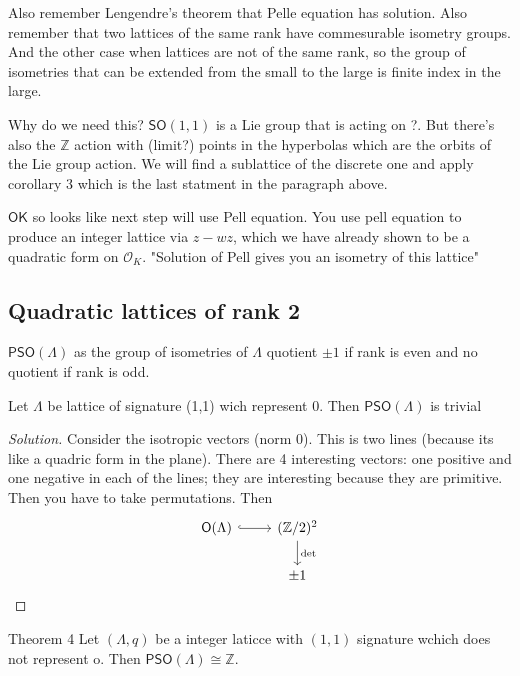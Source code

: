 Also remember Lengendre's theorem that Pelle equation has solution. Also remember that two lattices of the same rank have commesurable isometry groups. And the other case when lattices are not of the same rank, so the group of isometries that can be extended from the small to the large is finite index in the large.

Why do we need this? $\mathsf{SO}(1,1)$ is a Lie group that is acting on ?. But there's also the $\mathbb{Z}$ action with (limit?) points in the hyperbolas which are the orbits of the Lie group action. We will find a sublattice of the discrete one and apply corollary 3 which is the last statment in the paragraph above.

$\mathsf{OK}$ so looks like next step will use Pell equation. You use pell equation to produce an integer lattice via $z-wz$, which we have already shown to be a quadratic form on $\mathcal{O}_K$. {\color{4}"Solution of Pell gives you an isometry of this lattice"}

\subsection{Quadratic lattices of rank 2}

\begin{defn}\leavevmode
	$\mathsf{PSO}(\Lambda)$ as the group of isometries of $\Lambda$ quotient $\pm 1$ if rank is even and no quotient if rank is odd.
\end{defn}

\begin{exercise}\leavevmode
	Let $\Lambda$ be lattice of signature (1,1) wich represent 0. Then $\mathsf{PSO}(\Lambda)$ is trivial
\end{exercise}
\begin{proof}[Solution]\leavevmode
	Consider the isotropic vectors (norm 0). This is two lines (because its like a quadric form in the plane).  There are 4 interesting vectors: one positive and one negative in each of the lines; they are interesting because they are primitive. Then you have to take permutations. Then
	\[\begin{tikzcd}
		\mathsf{O}(\Lambda)\arrow[r,hook]&(\mathbb{Z}/2)^2\arrow[d,"\det "]\\
		& \pm 1
	\end{tikzcd}\]
\end{proof}

\begin{thing6}{Theorem 4}\leavevmode
	Let $(\Lambda,q)$ be a integer laticce with $(1,1)$ signature wchich does not represent o. Then  $\mathsf{PSO}(\Lambda) \cong \mathbb{Z}$.
\end{thing6}

